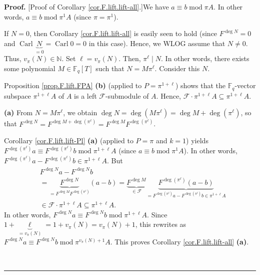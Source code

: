 \documentclass[numbers=enddot,12pt,final,onecolumn,notitlepage]{scrartcl}%
\theoremstyle{definition}
\newenvironment{proof}[1][Proof]{\noindent\textbf{#1.} }{\ \rule{0.5em}{0.5em}}
\begin{document}
\begin{proof}
[Proof of Corollary \ref{cor.F.lift.lift-all}.]We have $a\equiv
b\operatorname{mod}\pi A$. In other words, $a\equiv b\operatorname{mod}\pi
^{1}A$ (since $\pi=\pi^{1}$).

If $N=0$, then Corollary \ref{cor.F.lift.lift-all} is easily seen to hold
(since $F^{\deg N}=0$ and $\operatorname*{Carl}\underbrace{N}_{=0}%
=\operatorname*{Carl}0=0$ in this case). Hence, we WLOG assume that $N\neq0$.
Thus, $v_{\pi}\left(  N\right)  \in\mathbb{N}$. Set $\ell=v_{\pi}\left(
N\right)  $. Then, $\pi^{\ell}\mid N$. In other words, there exists some
polynomial $M\in\mathbb{F}_{q}\left[  T\right]  $ such that $N=M\pi^{\ell}$.
Consider this $N$.

Proposition \ref{prop.F.lift.FPA} \textbf{(b)} (applied to $P=\pi^{1+\ell}$)
shows that the $\mathbb{F}_{q}$-vector subspace $\pi^{1+\ell}A$ of $A$ is a
left $\mathcal{F}$-submodule of $A$. Hence, $\mathcal{F}\cdot\pi^{1+\ell
}A\subseteq\pi^{1+\ell}A$.

\textbf{(a)} From $N=M\pi^{\ell}$, we obtain $\deg N=\deg\left(  M\pi^{\ell
}\right)  =\deg M+\deg\left(  \pi^{\ell}\right)  $, so that $F^{\deg
N}=F^{\deg M+\deg\left(  \pi^{\ell}\right)  }=F^{\deg M}F^{\deg\left(
\pi^{\ell}\right)  }$.

Corollary \ref{cor.F.lift.lift-Pl} \textbf{(a)} (applied to $P=\pi$ and $k=1$)
yields \newline$F^{\deg\left(  \pi^{\ell}\right)  }a\equiv F^{\deg\left(
\pi^{\ell}\right)  }b\operatorname{mod}\pi^{1+\ell}A$ (since $a\equiv
b\operatorname{mod}\pi^{1}A$). In other words, $F^{\deg\left(  \pi^{\ell
}\right)  }a-F^{\deg\left(  \pi^{\ell}\right)  }b\in\pi^{1+\ell}A$. But
\begin{align*}
&  F^{\deg N}a-F^{\deg N}b\\
&  =\underbrace{F^{\deg N}}_{=F^{\deg M}F^{\deg\left(  \pi^{\ell}\right)  }%
}\left(  a-b\right)  =\underbrace{F^{\deg M}}_{\in\mathcal{F}}%
\underbrace{F^{\deg\left(  \pi^{\ell}\right)  }\left(  a-b\right)  }%
_{=F^{\deg\left(  \pi^{\ell}\right)  }a-F^{\deg\left(  \pi^{\ell}\right)
}b\in\pi^{1+\ell}A}\\
&  \in\mathcal{F}\cdot\pi^{1+\ell}A\subseteq\pi^{1+\ell}A.
\end{align*}
In other words, $F^{\deg N}a\equiv F^{\deg N}b\operatorname{mod}\pi^{1+\ell}%
A$. Since $1+\underbrace{\ell}_{=v_{\pi}\left(  N\right)  }=1+v_{\pi}\left(
N\right)  =v_{\pi}\left(  N\right)  +1$, this rewrites as $F^{\deg N}a\equiv
F^{\deg N}b\operatorname{mod}\pi^{v_{\pi}\left(  N\right)  +1}A$. This proves
Corollary \ref{cor.F.lift.lift-all} \textbf{(a)}.


\end{proof}
\end{document}
